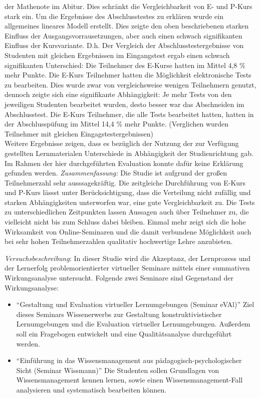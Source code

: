 der Mathenote im Abitur. Dies schränkt die Vergleichbarkeit von E- und
P-Kurs stark ein. Um die Ergebnisse des Abschlusstestes zu erklären
wurde ein allgemeines lineares Modell erstellt. Dies zeigte den oben
beschriebenen starken Einfluss der Ausgangsvorrausetzungen, aber auch
einen schwach signifikanten Einfluss der Kursvariante. D.h. Der
Vergleich der Abschlusstestergebnisse von Studenten mit gleichen
Ergebnissen im Eingangstest ergab einen schwach signifikanten
Unterschied: Die Teilnehmer des E-Kurse hatten im Mittel 4,8 \% mehr
Punkte. Die E-Kurs Teilnehmer hatten die Möglichkeit elektronische Tests
zu bearbeiten. Dies wurde zwar von vergleichsweise wenigen Teilnehmern
genutzt, dennoch zeigte sich eine signifikante Abhängigkeit: Je mehr
Tests von den jeweiligen Studenten bearbeitet wurden, desto besser war
das Abschneiden im Abschlusstest. Die E-Kurs Teilnehmer, die alle Tests
bearbeitet hatten, hatten in der Abschlusspüfung im Mittel 14,4 \% mehr
Punkte. (Verglichen wurden Teilnehmer mit gleichen
Eingagstestergebnissen)\\Weitere Ergebnisse zeigen, dass es bezüglich
der Nutzung der zur Verfügung gestellten Lernmaterialen Unterschiede in
Abhängigkeit der Studienrichtung gab. Im Rahmen der hier durchgeführten
Evaluation konnte dafür keine Erklärung gefunden werden.
\emph{Zusammenfassung:} Die Studie ist aufgrund der großen
Teilnehmerzahl sehr ausssagekräftig. Die zeitgleiche Durchführung von
E-Kurs und P-Kurs lässst unter Berücksichtigung, dass die Verteilung
nicht zufällig und starken Abhängigkeiten unterworfen war, eine gute
Vergleichbarkeit zu. Die Tests zu unterschiedlichen Zeitpunkten lassen
Aussagen auch über Teilnehmer zu, die vielleicht nicht bis zum Schluss
dabei bleiben. Einmal mehr zeigt sich die hohe Wirksamkeit von
Online-Seminaren und die damit verbundene Möglichkeit auch bei sehr
hohen Teilnehmerzahlen qualitativ hochwertige Lehre anzubieten.

\textbf{}

\emph{Versuchsbeschreibung}: In dieser Studie wird die Akzeptanz, der
Lernprozess und der Lernerfolg problemorientierter virtueller Seminare
mittels einer summativen Wirkungsanalyse untersucht. Folgende zwei
Seminare sind Gegenstand der Wirkungsanalyse:

\begin{itemize}
\item
  ``Gestaltung und Evaluation virtueller Lernumgebungen (Seminar eVAl)''
  Ziel dieses Seminars Wissenerwerbs zur Gestaltung konstruktivistischer
  Lernumgebungen und die Evaluation virtueller Lernumgebungen. Außerdem
  soll ein Fragebogen entwickelt und eine Qualitätsanalyse durchgeführt
  werden.
\item
  ``Einführung in das Wissensmanagement aus pädagogisch-psychologischer
  Sicht (Seminar Wissmann)'' Die Studenten sollen Grundlagen von
  Wissensmanagement kennen lernen, sowie einen Wissensmanagement-Fall
  analysieren und systematisch bearbeiten können.
\end{itemize}

